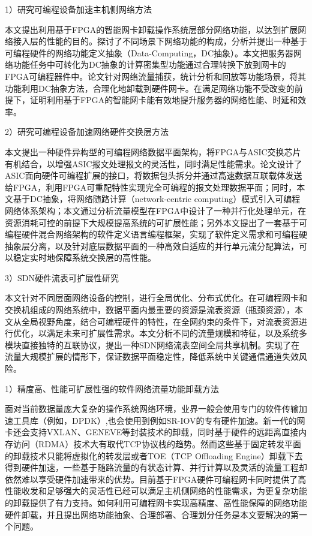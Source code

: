 1）研究可编程设备加速主机侧网络方法

本文提出利用基于FPGA的智能网卡卸载操作系统层部分网络功能，以达到扩展网络接入层的性能的目的。探讨了不同场景下网络功能的构成，分析并提出一种基于可编程硬件的网络功能定义抽象（Data-Computing，DC抽象）。本文把服务器网络功能任务中可转化为DC抽象的计算密集型功能通过合理转换下放到网卡的FPGA可编程器件中。论文针对网络流量捕获，统计分析和回放等功能场景，将其功能利用DC抽象方法，合理化地卸载到硬件网卡。在满足网络功能不受改变的前提下，证明利用基于FPGA的智能网卡能有效地提升服务器的网络性能、时延和效率。

2）研究可编程设备加速网络硬件交换层方法

本文提出一种硬件异构型的可编程网络数据平面架构，将FPGA与ASIC交换芯片有机结合，以增强ASIC报文处理报文的灵活性，同时满足性能需求。论文设计了ASIC面向硬件可编程扩展的接口，将数据包头拆分并通过高速数据互联载体发送给FPGA，利用FPGA可重配特性实现完全可编程的报文处理数据平面；同时，本文基于DC抽象，将网络随路计算（network-centric computing）模式引入可编程网络体系架构；本文通过分析流量模型在FPGA中设计了一种并行化处理单元，在资源消耗可控的前提下大规模提高系统的可扩展性能；另外本文提出了一套基于可编程硬件混合网络架构的软件定义语言编程框架，实现了软件定义需求和可编程硬抽象层分离，以及针对底层数据平面的一种高效自适应的并行单元流分配算法，可以稳定实时地保障系统交换层的高性能。

3）SDN硬件流表可扩展性研究

本文针对不同层面网络设备的控制，进行全局优化、分布式优化。在可编程网卡和交换机组成的网络系统中，数据平面内最重要的资源是流表资源（瓶颈资源），本文从全局视野角度，结合可编程硬件的特性，在全网约束的条件下，对流表资源进行优化，以满足未来可扩展性需求。本文分析不同的流量规模和特征，以及系统多模块直接独特的互联协议，提出一种SDN网络流表空间全局共享机制。实现了在流量大规模扩展的情形下，保证数据平面稳定性，降低系统中关键通信通道失效风险。



1）精度高、性能可扩展性强的软件网络流量功能卸载方法

面对当前数据量庞大复杂的操作系统网络环境，业界一般会使用专门的软件传输加速工具库（例如，DPDK）,也会使用到例如SR-IOV的专有硬件加速。新一代的网卡还会支持VXLAN、GENEVE等封装技术的卸载，同时基于硬件的远距离直接内存访问（RDMA）技术大有取代TCP协议栈的趋势。然而这些基于固定转发平面的卸载技术只能将虚拟化的转发层或者TOE（TCP Offloading Engine）卸载下去得到硬件加速，一些基于随路流量的有状态计算、并行计算以及灵活的流量工程却依然难以享受硬件加速带来的优势。目前基于FPGA硬件可编程网卡同时提供了高性能收发和足够强大的灵活性已经可以满足主机侧网络的性能需求，为更复杂功能的卸载提供了有力支持。如何利用可编程网卡实现高精度、高性能保障的网络功能硬件卸载，并且提出网络功能抽象、合理部署、合理划分任务是本文要解决的第一个问题。

